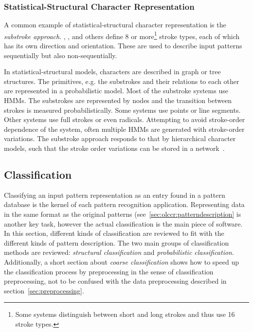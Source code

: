 \subsubsection{Statistical-Structural Character Representation}
\label{sec:olccr:statistical-structuralcharacterrepresentation}

A common example of statistical-structural character representation is the 
\emph{substroke approach}. , , 
 and others define 8 or more\footnote{Some systems 
distinguish between short and long strokes and thus use 16 stroke types.} stroke 
types, each of which has its own direction and orientation. These are used to
describe input patterns sequentially but also non-sequentially.

In statistical-structural models, characters are described in graph or tree 
structures. The primitives, e.g. the substrokes and their relations to each other
are represented in a probabilistic model. 
Most of the substroke systems use HMMs. The substrokes are represented by nodes
and the transition between strokes is measured probabilistically. Some systems
use points or line segments. Other systems use full strokes or even radicals.
Attempting to avoid stroke-order dependence of the system, often multiple HMMs
are generated with stroke-order variations.
The substroke approach responds to that by hierarchical character models,
such that the stroke order variations can be stored in a 
network~.  

\subsection{Classification}
\label{sec:olccr:classification}


Classifying an input pattern representation as an entry found in a pattern 
database is the kernel of each pattern recognition application.
Representing data in the same format as the original patterns 
(see~\ref{sec:olccr:patterndescription} is another key task, however the actual
classification is the main piece of software.
In this section, different kinds of classification are reviewed to fit with
the different kinds of pattern description. The two main groups of 
classification methods are reviewed: \emph{structural classification} and 
\emph{probabilistic classification}.
Additionally, a short section about \emph{coarse classification} shows how to
speed up the classification process by preprocessing in the sense of 
classification preprocessing, not to be confused with the data preprocessing
described in section~\ref{sec:preprocessing}.

